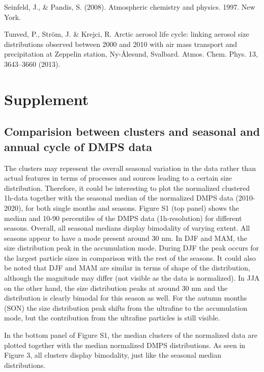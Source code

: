 \documentclass[11pt]{article}
\begin{document}
Seinfeld, J., \& Pandis, S. (2008). Atmospheric chemistry and physics.
1997. New York.

Tunved, P., Ström, J. \& Krejci, R. Arctic aerosol life cycle: linking
aerosol size distributions observed between 2000 and 2010 with air mass
transport and precipitation at Zeppelin station, Ny-Ålesund, Svalbard.
Atmos. Chem. Phys. 13, 3643--3660 (2013).

    \hypertarget{supplement}{%
\section{Supplement}\label{supplement}}

\hypertarget{comparision-between-clusters-and-seasonal-and-annual-cycle-of-dmps-data}{%
\subsection{Comparision between clusters and seasonal and annual cycle
of DMPS
data}\label{comparision-between-clusters-and-seasonal-and-annual-cycle-of-dmps-data}}

The clusters may represent the overall seasonal variation in the data
rather than actual features in terms of processes and sources leading to
a certain size distribution. Therefore, it could be interesting to plot
the normalized clustered 1h-data together with the seasonal median of
the normalized DMPS data (2010-2020), for both single months and
seasons. Figure S1 (top panel) shows the median and 10-90 percentiles of
the DMPS data (1h-resolution) for different seasons. Overall, all
seasonal medians display bimodality of varying extent. All seasons
appear to have a mode present around 30 nm. In DJF and MAM, the size
distribution peak in the accumulation mode. During DJF the peak occurs
for the largest particle sizes in comparison with the rest of the
seasons. It could also be noted that DJF and MAM are similar in terms of
shape of the distribution, although the magnitude may differ (not
visible as the data is normalized). In JJA on the other hand, the size
distribution peaks at around 30 nm and the distribution is clearly
bimodal for this season as well. For the autumn months (SON) the size
distribution peak shifts from the ultrafine to the accumulation mode,
but the contribution from the ultrafine particles is still visible.

In the bottom panel of Figure S1, the median clusters of the normalized
data are plotted together with the median normalized DMPS distributions.
As seen in Figure 3, all clusters display bimodality, just like the
seasonal median distributions.
\end{document}
